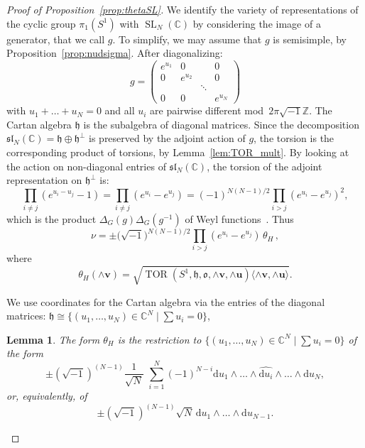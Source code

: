 \documentclass[11pt]{article}
\newtheorem{lemm}[theo]{Lemma}
\theoremstyle{definition}
\numberwithin{equation}{section}
\numberwithin{figure}{section}
\numberwithin{table}{section}
\DeclareMathOperator{\SL}{SL}
\DeclareMathOperator{\TOR}{TOR}
\newcommand{\Cbb}{\mathbb{C}}
\newcommand{\Zbb}{\mathbb{Z}}
\newcommand{\ofrk}{\mathfrak{o}}
\newcommand{\hfrk}{\mathfrak{h}}
\newcommand{\slfrk}{\mathfrak{sl}}
\newcommand{\ubf}{\mathbf{u}}
\newcommand{\vbf}{\mathbf{v}}
\newcommand*{\dd}{\mathrm{d}}
\begin{document}
\begin{proof}[Proof of Proposition~\ref{prop:thetaSL}]
We identify the variety of representations of the cyclic group $ \pi_1(S^1)$ with $\SL_N (\Cbb)$ by considering the image of a generator, that we call $g$. To simplify, we may assume that $g$ is semisimple, by Proposition~\ref{prop:nudsigma}. After diagonalizing:
\[
g=
\begin{pmatrix}
e^{u_1} & 0 & & 0\\
0 & e^{u_2} & & 0 \\
& & \ddots & \\
0&0 & & e^{u_N}
\end{pmatrix}
\]
with $u_1+\dots + u_N=0$ and all $u_i$ are pairwise different mod~$2\pi \sqrt{-1}\Zbb$. The Cartan algebra $\hfrk$ is the subalgebra of diagonal matrices. Since the decomposition $\slfrk_N (\Cbb)=\hfrk\oplus \hfrk^\perp$ is preserved by the adjoint action of $g$, the torsion is the corresponding product of torsions, by Lemma~\ref{lem:TOR_mult}. By looking at the action on non-diagonal entries of $\slfrk_N (\Cbb)$, the torsion of the adjoint representation on $\hfrk^\perp$ is:
\[
\prod_{i\neq j} (e^{u_i-u_j}-1)=\prod_{i\neq j} (e^{u_i}-e^{u_j})=(-1)^{N(N-1)/2} \prod_{i> j}(e^{u_i}-e^{u_j})^2,
\]
which is the product $\Delta_G(g)\Delta_G(g^{-1})$ of Weyl functions~\cite[Section~7]{GoodWall}. Thus
\begin{equation}\label{eqn:thetaOmega}
\nu=\pm \big(\sqrt{-1}\big)^{N(N-1)/2} \prod_{i> j}(e^{u_i}-e^{u_j}) \, \theta_H\,,
\end{equation}
where
\begin{equation}\label{eqn:Omega}
\theta_H(\wedge\vbf)= \sqrt{\TOR(S^1,\hfrk,\ofrk,\wedge\vbf,\wedge\ubf)
\langle \wedge\vbf,\wedge\ubf\rangle }.
\end{equation}



We use coordinates for the Cartan algebra via the entries of the diagonal matrices: $\hfrk\cong \{(u_1,\dots,u_N)\in \Cbb^N\mid \sum u_i=0 \} $,



\begin{lemm}\label{lemmma:wedgewithdui}
The form $\theta_H$ is the restriction to $\{(u_1,\dots,u_N)\in \Cbb^N\mid \sum u_i=0 \} $ of the form
\[
\pm \left(\sqrt{-1} \right)^{(N-1)} \frac{1}{\sqrt N} \, \, \sum_{i=1}^N (-1)^{N-i}\dd u_1\wedge\dots\wedge \widehat{\dd u_i}\wedge \dots \wedge \dd u_N,
\]
or, equivalently, of
\[
\pm \left(\sqrt{-1} \right)^{(N-1)} \sqrt N \, \dd u_1\wedge\dots\wedge \dd u_{N-1}.
\]
\end{lemm}


\end{proof}
\end{document}
